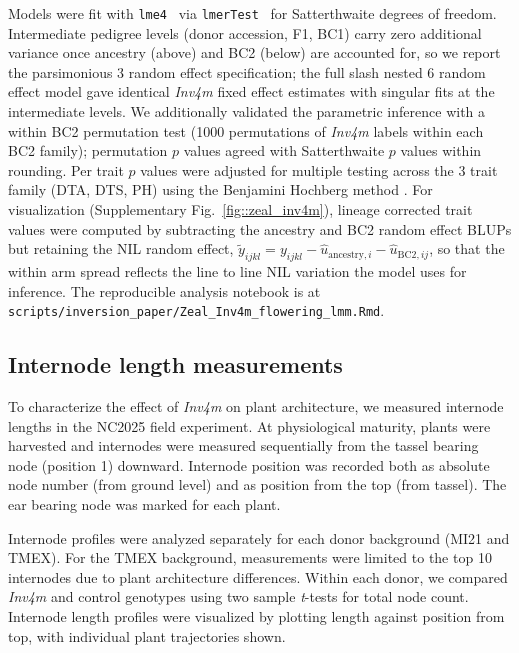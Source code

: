 \documentclass[9pt,twocolumn,twoside]{rilabRxiv}
\newcommand{\invfour}{\textit{Inv4m}\xspace}
\begin{document}
Models were fit with \texttt{lme4}~\cite{bates2015} via \texttt{lmerTest}~\cite{kuznetsova2017} for Satterthwaite degrees of freedom. 
Intermediate pedigree levels (donor accession, F1, BC1) carry zero additional variance once ancestry (above) and BC2 (below) are accounted for, so we report the parsimonious 3 random effect specification; the full slash nested 6 random effect model gave identical \invfour fixed effect estimates with singular fits at the intermediate levels.
We additionally validated the parametric inference with a within BC2 permutation test (1000 permutations of \invfour labels within each BC2 family); permutation $p$ values agreed with Satterthwaite $p$ values within rounding.
Per trait $p$ values were adjusted for multiple testing across the 3 trait family (DTA, DTS, PH) using the Benjamini Hochberg method \cite{benjamini1995}.
For visualization (Supplementary Fig.~\ref{fig::zeal_inv4m}), lineage corrected trait values were computed by subtracting the ancestry and BC2 random effect BLUPs but retaining the NIL random effect, $\tilde{y}_{ijkl} = y_{ijkl} - \hat{u}_{\text{ancestry},i} - \hat{u}_{\text{BC2},ij}$, so that the within arm spread reflects the line to line NIL variation the model uses for inference.
The reproducible analysis notebook is at \texttt{scripts/inversion\_paper/Zeal\_Inv4m\_flowering\_lmm.Rmd}.

\subsection{Internode length measurements}

To characterize the effect of \invfour on plant architecture, we measured internode lengths in the NC2025 field experiment.
At physiological maturity, plants were harvested and internodes were measured sequentially from the tassel bearing node (position 1) downward.
Internode position was recorded both as absolute node number (from ground level) and as position from the top (from tassel).
The ear bearing node was marked for each plant.

Internode profiles were analyzed separately for each donor background (MI21 and TMEX).
For the TMEX background, measurements were limited to the top 10 internodes due to plant architecture differences.
Within each donor, we compared \invfour and control genotypes using two sample \textit{t}-tests for total node count.
Internode length profiles were visualized by plotting length against position from top, with individual plant trajectories shown.
\end{document}
